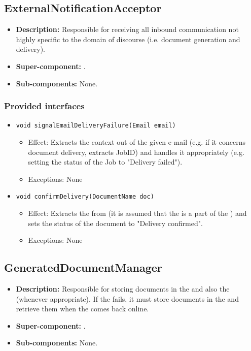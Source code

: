 \subsection{ExternalNotificationAcceptor}
\begin{itemize}
    \item \textbf{Description:} Responsible for receiving all inbound communication not highly specific to the domain of discourse (i.e. document generation and delivery).
    \item \textbf{Super-component:} .
    \item \textbf{Sub-components:} None.
\end{itemize}

\subsubsection*{Provided interfaces}
\begin{itemize}
    \item \texttt{void signalEmailDeliveryFailure(Email email)}
        \begin{itemize}
            \item Effect: Extracts the context out of the given e-mail (e.g. if it concerns document delivery, extracts JobID) and handles it appropriately (e.g. setting the status of the Job to "Delivery failed").
            \item Exceptions: None
        \end{itemize}

		\item \texttt{void confirmDelivery(DocumentName doc)}
        \begin{itemize}
            \item Effect: Extracts the  from  (it is assumed that the  is a part of the ) and sets the status of the document to "Delivery confirmed".
            \item Exceptions: None
        \end{itemize}
\end{itemize}

\subsection{GeneratedDocumentManager}
\begin{itemize}
    \item \textbf{Description:} Responsible for storing documents in the  and also the  (whenever appropriate). If the  fails, it must store documents in the  and retrieve them when the  comes back online.
    \item \textbf{Super-component:} .
    \item \textbf{Sub-components:} None.
\end{itemize}

